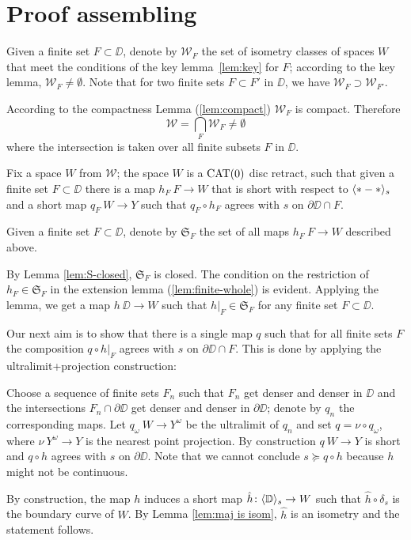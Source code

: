 \section{Proof assembling}\label{Main theorem}



Given a finite set $F\subset \DD$,
denote by $\mathcal{W}_F$
the set of isometry classes of spaces $W$ that meet the conditions of the key lemma~\ref{lem:key}
for $F$;
according to the key lemma, $\mathcal{W}_F\ne\emptyset$.
Note that for two finite sets $F\subset F'$ in $\DD$,
we have $\mathcal{W}_F\supset \mathcal{W}_{F'}$.

According to the compactness Lemma (\ref{lem:compact}) $\mathcal{W}_F$ is compact.
Therefore 
\[\mathcal{W}
=
\bigcap_{F}\mathcal{W}_F\ne \emptyset\]
where the intersection is taken over all finite subsets $F$ in $\DD$. 


Fix a space $W$ from $\mathcal{W}$;
the space $W$ is a $\mathop{\rm CAT}\nolimits(0)$ disc retract,
such that given a finite set $F\subset \DD$ there is a map $h_F\:F\to W$ that is short with 
respect to $\langle{*}-{*}\rangle_s$ 
and a short map $q_F\:W\to Y$ such that $q_F\circ h_F$ agrees with $s$ on $\partial\DD\cap F$.

Given a finite set $F\subset \DD$,
denote by $\mathfrak{S}_F$ the set of all maps $h_F\:F\to W$ described above.

By Lemma \ref{lem:S-closed}, $\mathfrak{S}_F$ is closed.
The condition on the restriction of $h_F\in  \mathfrak{S}_F$ in the extension lemma (\ref{lem:finite-whole}) is evident.
Applying the lemma,
we get a map $h\:\DD\to W$ such that $h|_F\in \mathfrak{S}_F$
for any finite set $F\subset \DD$.

Our next aim is to show that there is a single map $q$ such that
for all finite sets $F$ the composition $q\circ h|_F$ agrees with
$s$ on $\partial\DD\cap F$.
This is done by applying the ultralimit+projection construction:

Choose a sequence of finite sets $F_n$ such that $F_n$ get denser and denser in $\DD$ and
the intersections $F_n\cap\partial \DD$ get denser and denser in $\partial \DD$; 
denote by $q_n$ the corresponding maps.
Let $q_\omega\:W\to Y^\omega$ be the ultralimit of $q_n$ and set $q=\nu\circ q_\omega$,
where $\nu\:Y^\omega\to Y$ is the nearest point projection.
By construction $q\:W\to Y$ is short and $q\circ h$ agrees with $s$ on $\partial \DD$.
Note that we cannot conclude $s\succcurlyeq q\circ h$ because $h$ might not be continuous.

By construction, the map $h$ induces a short map $\hat h\colon\langle\mathbb{D}\rangle_s\to W$ 
such that $\hat h\circ\delta_s$ is the boundary curve of $W$.
By Lemma \ref{lem:maj is isom}, $\hat h$ is an isometry and the statement follows.
\qeds